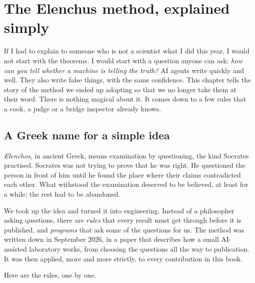 \xdef\labelcourant{ch:elenchus}
\chapter{The Elenchus method, explained simply}

If I had to explain to someone who is not a scientist what I did this year, I would not start with the theorems. I
would start with a question anyone can ask: \emph{how can you tell whether a machine is telling the truth?} AI agents
write quickly and well. They also write false things, with the same confidence. This chapter tells the story of the
method we ended up adopting so that we no longer take them at their word. There is nothing magical about it. It comes
down to a few rules that a cook, a judge or a bridge inspector already knows.

\section{A Greek name for a simple idea}

\emph{Elenchos}, in ancient Greek, means examination by questioning, the kind Socrates practised. Socrates was not
trying to prove that he was right. He questioned the person in front of him until he found the place where their
claims contradicted each other. What withstood the examination deserved to be believed, at least for a while; the
rest had to be abandoned.

We took up the idea and turned it into engineering. Instead of a philosopher asking questions, there are \emph{rules}
that every result must get through before it is published, and \emph{programs} that ask some of the questions for us.
The method was written down in September 2026, in a paper that describes how a small AI-assisted laboratory works,
from choosing the questions all the way to publication. It was then applied, more and more strictly, to every contribution
in this book.

Here are the rules, one by one.

